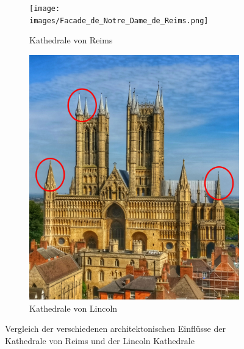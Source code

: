 \documentclass[a4paper, ngerman, 12pt, usenames, dvipsnames]{article}
\begin{document}
\begin{figure}[h]
    \centering
    \begin{subfigure}{.43\textwidth}
        \centering
        \texttt{[image: images/Facade\_de\_Notre\_Dame\_de\_Reims.png]}
        \caption{Kathedrale von Reims \footnotemark}
    \end{subfigure}%
    \begin{subfigure}{.57\textwidth}
        \centering
        \includegraphics[width=.9\linewidth]{images/LincolnCathedral.jpg}
        \caption{Kathedrale von Lincoln \footnotemark}
    \end{subfigure}
    \caption{Vergleich der verschiedenen architektonischen Einflüsse der Kathedrale von Reims und der Lincoln Kathedrale}
\end{figure}
\end{document}
